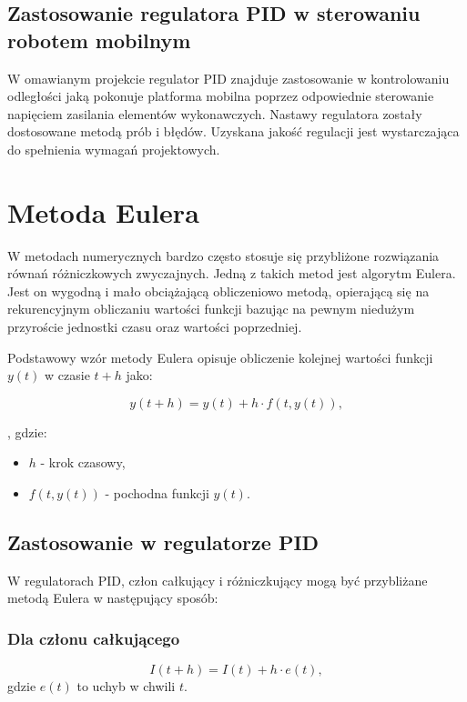 \subsection{Zastosowanie regulatora PID w sterowaniu robotem mobilnym}

W omawianym projekcie regulator PID znajduje zastosowanie w kontrolowaniu odległości jaką pokonuje platforma mobilna poprzez odpowiednie sterowanie napięciem zasilania elementów wykonawczych. Nastawy regulatora zostały dostosowane metodą prób i błędów. Uzyskana jakość regulacji jest wystarczająca do spełnienia wymagań projektowych. 

\section{Metoda Eulera}
\label{seq:Euler}
W metodach numerycznych bardzo często stosuje się przybliżone rozwiązania równań różniczkowych zwyczajnych. Jedną z takich metod jest algorytm Eulera. Jest on wygodną i mało obciążającą obliczeniowo metodą, opierającą się na rekurencyjnym obliczaniu wartości funkcji bazując na pewnym niedużym przyroście jednostki czasu oraz wartości poprzedniej. 

Podstawowy wzór metody Eulera opisuje obliczenie kolejnej wartości funkcji \(y(t)\) w czasie \(t + h\) jako:

\begin{equation}
    y(t + h) = y(t) + h \cdot f(t, y(t)),
\end{equation}

, gdzie:
\begin{itemize}
    \item \(h\) - krok czasowy,
    \item \(f(t, y(t))\) - pochodna funkcji \(y(t)\).
\end{itemize}

\subsection{Zastosowanie w regulatorze PID}

W regulatorach PID, człon całkujący i różniczkujący mogą być przybliżane metodą Eulera w następujący sposób:

\subsubsection*{Dla członu całkującego}

\begin{equation}
    I(t + h) = I(t) + h \cdot  e(t),
\end{equation}
gdzie \(e(t)\) to uchyb w chwili \(t\).

